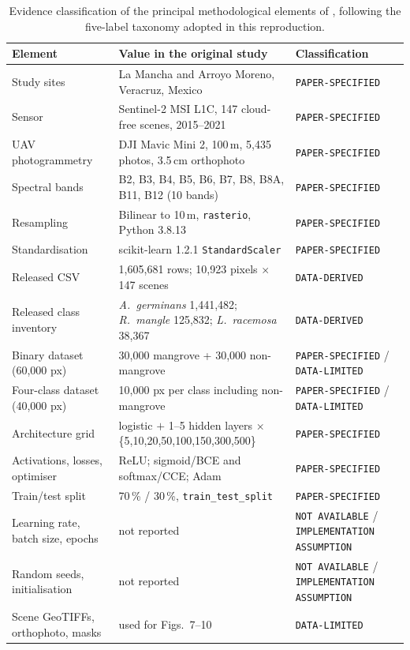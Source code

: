 \documentclass[10pt,twocolumn,a4paper]{article}
\newcommand{\evc}[1]{{\footnotesize\texttt{#1}}}
\begin{document}
\begin{table}[!t]
\centering
\caption{Evidence classification of the principal methodological elements of
\citet{monterrubio2025}, following the five-label taxonomy adopted in this reproduction.}
\label{tab:spec}
\footnotesize
\begin{tabular}{p{4.1cm} p{8.4cm} p{4.0cm}}
\toprule
\textbf{Element} & \textbf{Value in the original study} & \textbf{Classification} \\
\midrule
Study sites & La Mancha and Arroyo Moreno, Veracruz, Mexico & \evc{PAPER-SPECIFIED} \\
Sensor & Sentinel-2 MSI L1C, 147 cloud-free scenes, 2015--2021 & \evc{PAPER-SPECIFIED} \\
UAV photogrammetry & DJI Mavic Mini 2, 100\,m, 5{,}435 photos, 3.5\,cm orthophoto & \evc{PAPER-SPECIFIED} \\
Spectral bands & B2, B3, B4, B5, B6, B7, B8, B8A, B11, B12 (10 bands) & \evc{PAPER-SPECIFIED} \\
Resampling & Bilinear to 10\,m, \texttt{rasterio}, Python 3.8.13 & \evc{PAPER-SPECIFIED} \\
Standardisation & scikit-learn 1.2.1 \texttt{StandardScaler} & \evc{PAPER-SPECIFIED} \\
Released CSV & 1{,}605{,}681 rows; 10{,}923 pixels $\times$ 147 scenes & \evc{DATA-DERIVED} \\
Released class inventory & \emph{A.\ germinans} 1{,}441{,}482; \emph{R.\ mangle} 125{,}832; \emph{L.\ racemosa} 38{,}367 & \evc{DATA-DERIVED} \\
Binary dataset (60{,}000 px) & 30{,}000 mangrove + 30{,}000 non-mangrove & \evc{PAPER-SPECIFIED} / \evc{DATA-LIMITED} \\
Four-class dataset (40{,}000 px) & 10{,}000 px per class including non-mangrove & \evc{PAPER-SPECIFIED} / \evc{DATA-LIMITED} \\
Architecture grid & logistic $+$ 1--5 hidden layers $\times$ \{5,10,20,50,100,150,300,500\} & \evc{PAPER-SPECIFIED} \\
Activations, losses, optimiser & ReLU; sigmoid/BCE and softmax/CCE; Adam & \evc{PAPER-SPECIFIED} \\
Train/test split & 70\,\% / 30\,\%, \texttt{train\_test\_split} & \evc{PAPER-SPECIFIED} \\
Learning rate, batch size, epochs & not reported & \evc{NOT AVAILABLE} / \evc{IMPLEMENTATION ASSUMPTION} \\
Random seeds, initialisation & not reported & \evc{NOT AVAILABLE} / \evc{IMPLEMENTATION ASSUMPTION} \\
Scene GeoTIFFs, orthophoto, masks & used for Figs.~7--10 & \evc{DATA-LIMITED} \\
\bottomrule
\end{tabular}
\end{table}
\end{document}
